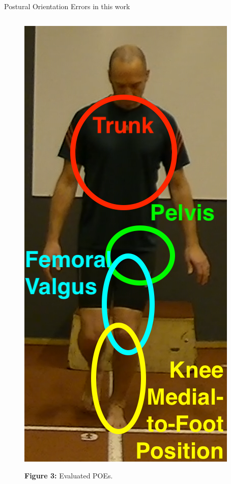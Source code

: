 \begin{frame}[fragile]{Postural Orientation Errors in this work}
\begin{columns}[T,onlytextwidth]
    \begin{figure}
      \includegraphics[height=0.76\textheight]{files/figs/presentation/poe-segments.png}

      {\scriptsize \hspace{0.5cm}\textbf{Figure 3:} Evaluated POEs.\newline}
    \end{figure}



\end{columns}
\end{frame}
